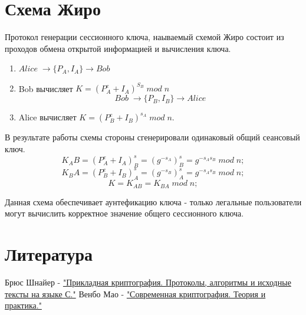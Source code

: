 \documentclass[a4paper]{article}
\begin{document}
\section*{Схема Жиро}
Протокол генерации сессионного ключа, наываемый схемой Жиро состоит из проходов обмена открытой информацией и вычисления ключа.
\begin{enumerate}
    \item $Alice \; \rightarrow \{ P_A, I_A\} \rightarrow Bob$
    \item Bob вычисляет $K = (P_A^e + I_A)^{S_B} \; mod \; n$
    $$ Bob \; \rightarrow \{ P_B, I_B\} \rightarrow Alice $$
    \item Alice вычисляет $K =(P_B^e + I_B)^{s_A} \; mod \; n$.
\end{enumerate}
В результате работы схемы стороны сгенерировали одинаковый общий сеансовый ключ.
$$K_AB = (P_A^e + I_A)^s_B = (g^{-s_A})^s_B = g^{-s_As_B} \; mod \; n ;$$
$$K_BA = (P_B^e + I_B)^s_A = (g^{-s_B})^s_A = g^{-s_As_B} \; mod \; n ;$$
$$K = K_{AB} =K_{BA} \; mod \; n ;$$

Данная схема обеспечивает аунтефикацию ключа - только легальные пользователи могут вычислить корректное значение общего сессионного ключа.
\section{Литература}

\begin{thebibliography}{}
      Брюс Шнайер -  \href{https://lib.mipt.ru/book/n/00013022000cdbe8096da0a688d3a130/Shnaier-B-Prikladnaya-kriptografiya-Protokoly-algoritmy-i-ishodnye-teksty-na-yazyke-S.pdf}{"Прикладная криптография. Протоколы, алгоритмы и исходные тексты на языке С."}
      Венбо Мао -  \href{https://lib.mipt.ru/book/266371/?q=+криптографические+протоколы}{"Современная криптография. Теория и практика."}
\end{thebibliography}
\end{document}
